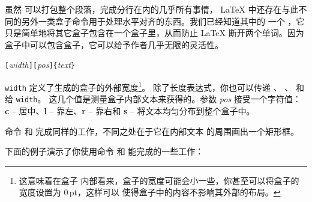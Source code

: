 虽然 可以打包整个段落，完成分行在内的几乎所有事情，
\LaTeX{} 中还存在与此不同的另外一类盒子命令用于处理水平对齐的东西。我们已经知道其中的
一个 \pozhehao {}，它只是简单地将其它盒子包含在一个盒子里，从而防止
 \LaTeX{} 断开两个单词。因为盒子中可以包含盒子，它可以给予作者几乎无限的灵活性。

\begin{lscommand}
\verb|[|\emph{width}\verb|][|\emph{pos}\verb|]{|\emph{text}\verb|}|
\end{lscommand}

\noindent \texttt{width} 定义了生成的盒子的外部宽度\footnote{这意味着在盒子
内部看来，盒子的宽度可能会小一些，你甚至可以将盒子的宽度设置为 0\,pt，这样可以
使得盒子中的内容不影响其外部的布局。}。 除了长度表达式，你也可以传递
 、 、  和  给 \texttt{width}。
这几个值是测量盒子内部文本来获得的。参数 \emph{pos} 接受一个字符值：
\textbf{c} -- 居中、\textbf{l} -- 靠左、\textbf{r} -- 靠右和 \textbf{s} -- 
将文本均匀分布到整个盒子中。

命令  和  完成同样的工作，不同之处在于它在内部文本
的周围画出一个矩形框。

下面的例子演示了你使用命令  和  能完成的一些工作：

